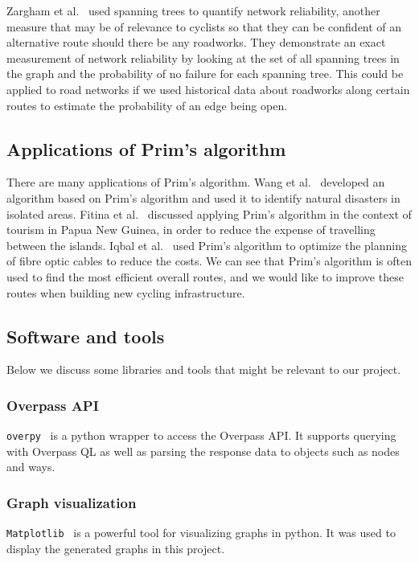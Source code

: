 \documentclass[12pt,a4paper]{report}
\begin{document}
Zargham et al.~\cite{zarghami2020} used spanning trees to quantify network reliability, another measure that may be of relevance to cyclists so that they can be confident of an alternative route should there be any roadworks. They demonstrate an exact measurement of network reliability by looking at the set of all spanning trees in the graph and the probability of no failure for each spanning tree. This could be applied to road networks if we used historical data about roadworks along certain routes to estimate the probability of an edge being open.

\subsection{Applications of Prim's algorithm}
There are many applications of Prim's algorithm. Wang et al.~\cite{wang2018} developed an algorithm based on Prim's algorithm and used it to identify natural disasters in isolated areas. Fitina et al.~\cite{fitina} discussed applying Prim's algorithm in the context of tourism in Papua New Guinea, in order to reduce the expense of travelling between the islands. Iqbal et al.~\cite{iqbal2017} used Prim's algorithm to optimize the planning of fibre optic cables to reduce the costs. We can see that Prim's algorithm is often used to find the most efficient overall routes, and we would like to improve these routes when building new cycling infrastructure. 

\subsection{Software and tools}
Below we discuss some libraries and tools that might be relevant to our project.

\subsubsection*{Overpass API}
\texttt{overpy}~\cite{overpy} is a python wrapper to access the Overpass API. It supports querying with Overpass QL as well as parsing the response data to objects such as nodes and ways. 

\subsubsection*{Graph visualization}
\texttt{Matplotlib}~\cite{Hunter:2007} is a powerful tool for visualizing graphs in python. It was used to display the generated graphs in this project.
\end{document}
